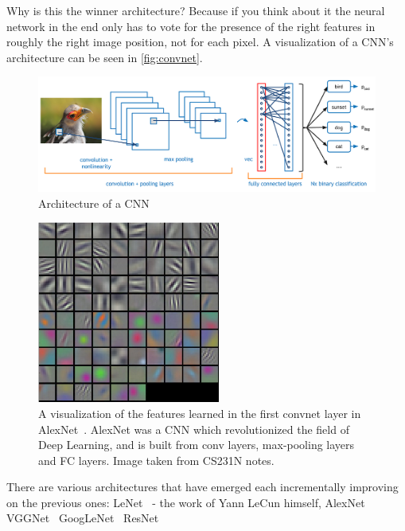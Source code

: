 Why is this the winner architecture? Because if you think about it the neural
network in the end only has to vote for the presence of the right features in roughly
the right image position, not for each pixel. A visualization of a
CNN's architecture can be seen in \autoref{fig:convnet}.

\begin{figure}[!ht]
    \centering
    \includegraphics[width=150mm, keepaspectratio]{figures/convnet.png}
    \caption{Architecture of a CNN}
    \label{fig:convnet}
\end{figure}

\begin{figure}[!ht]
    \centering
    \includegraphics[width=60mm, keepaspectratio]{figures/filters.png}
    \caption{A visualization of the features learned in the first convnet layer in AlexNet~\cite{NIPS2012_4824}. AlexNet was a CNN which revolutionized the field of Deep Learning, and is built from conv layers, max-pooling layers and FC layers. Image taken from CS231N notes.}
    \label{fig:filters}
\end{figure}

There are various architectures that have emerged each incrementally improving
on the previous ones: LeNet~\cite{Lecun98gradient-basedlearning} - the work of
Yann LeCun himself, AlexNet~\cite{NIPS2012_4824}
VGGNet~\cite{DBLP:journals/corr/SimonyanZ14a}
GoogLeNet~\cite{DBLP:journals/corr/SzegedyLJSRAEVR14}
ResNet~\cite{DBLP:journals/corr/HeZRS15}

